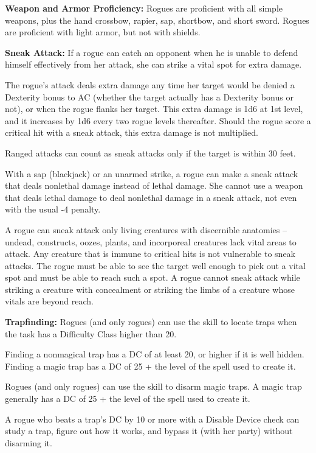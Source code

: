 \classfeatures

\textbf{Weapon and Armor Proficiency:} Rogues are proficient with all simple weapons, plus the hand crossbow, rapier, sap, shortbow, and short sword. Rogues are proficient with light armor, but not with shields.

\textbf{Sneak Attack:} If a rogue can catch an opponent when he is unable to defend himself effectively from her attack, she can strike a vital spot for extra damage.

The rogue's attack deals extra damage any time her target would be denied a Dexterity bonus to AC (whether the target actually has a Dexterity bonus or not), or when the rogue flanks her target. This extra damage is 1d6 at 1st level, and it increases by 1d6 every two rogue levels thereafter. Should the rogue score a critical hit with a sneak attack, this extra damage is not multiplied.

Ranged attacks can count as sneak attacks only if the target is within 30 feet.

With a sap (blackjack) or an unarmed strike, a rogue can make a sneak attack that deals nonlethal damage instead of lethal damage. She cannot use a weapon that deals lethal damage to deal nonlethal damage in a sneak attack, not even with the usual -4 penalty.

A rogue can sneak attack only living creatures with discernible anatomies -- undead, constructs, oozes, plants, and incorporeal creatures lack vital areas to attack. Any creature that is immune to critical hits is not vulnerable to sneak attacks. The rogue must be able to see the target well enough to pick out a vital spot and must be able to reach such a spot. A rogue cannot sneak attack while striking a creature with concealment or striking the limbs of a creature whose vitals are beyond reach.

\textbf{Trapfinding:} Rogues (and only rogues) can use the  skill to locate traps when the task has a Difficulty Class higher than 20. 

Finding a nonmagical trap has a DC of at least 20, or higher if it is well hidden. Finding a magic trap has a DC of 25 + the level of the spell used to create it.

Rogues (and only rogues) can use the  skill to disarm magic traps. A magic trap generally has a DC of 25 + the level of the spell used to create it.

A rogue who beats a trap's DC by 10 or more with a Disable Device check can study a trap, figure out how it works, and bypass it (with her party) without disarming it.

